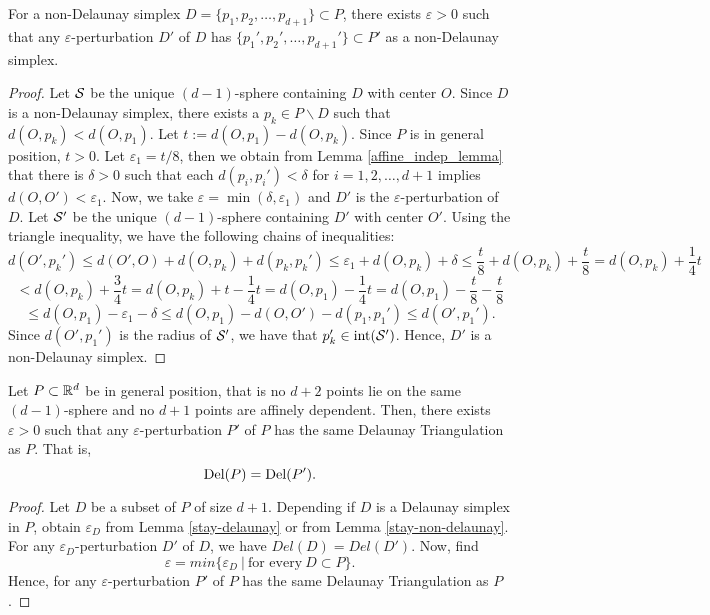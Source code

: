 \documentclass[letterpaper,titlepage]{article}
\begin{document}
    \begin{lem}\label{stay-non-delaunay}
        For a non-Delaunay simplex $D= \{p_1,p_2,\dots,p_{d+1}\} \subset P$, there exists $\varepsilon>0$ such that any $\varepsilon$-perturbation $D'$ of $D$ has $\{p_1',p_2',\dots,p_{d+1}'\} \subset P'$ as a non-Delaunay simplex.
    \end{lem}
    \begin{proof}
        Let $\mathcal{S}$ be the unique $(d-1)$-sphere containing $D$ with center $O$. Since $D$ is a non-Delaunay simplex, there exists a $p_k \in P\backslash D$ such that $d(O,p_k) < d(O,p_1)$. Let $t:=d(O,p_1)-d(O,p_k)$. Since $P$ is in general position, $t>0$. Let $\varepsilon_1 = t/8$, then we obtain from Lemma \ref{affine_indep_lemma} that there is $\delta>0$ such that each $d(p_i,p_i')<\delta$ for $i=1,2,\dots,d+1$ implies $d(O,O')<\varepsilon_1$. Now, we take $\varepsilon = \min(\delta, \varepsilon_1)$ and $D'$ is the $\varepsilon$-perturbation of $D$. Let $\mathcal{S}'$ be the unique $(d-1)$-sphere containing $D'$ with center $O'$. Using the triangle inequality, we have the following chains of inequalities:
        $$d(O',p_k') \leq d(O',O)+d(O,p_k)+d(p_k,p_k') \leq \varepsilon_1 + d(O,p_k)+\delta \leq \frac{t}{8}+d(O,p_k)+\frac{t}{8}=d(O,p_k)+\frac{1}{4}t$$
        $$< d(O,p_k)+\frac{3}{4}t = d(O,p_k)+t-\frac{1}{4}t = d(O,p_1)-\frac{1}{4}t = d(O,p_1)-\frac{t}{8}-\frac{t}{8}$$
        $$\leq d(O,p_1)-\varepsilon_1-\delta \leq d(O,p_1)-d(O,O')-d(p_1,p_1') \leq d(O',p_1').$$
        Since $d(O',p_1')$ is the radius of $\mathcal{S}'$, we have that $p_k' \in \text{int}(\mathcal{S}')$. Hence, $D'$ is a non-Delaunay simplex.
    \end{proof}
    
    
    \begin{thm}
        Let $P \subset \mathbb{R}^d$ be in general position, that is no $d+2$ points lie on the same $(d-1)$-sphere and no $d+1$ points are affinely dependent. Then, there exists $\varepsilon>0$ such that any $\varepsilon$-perturbation $P'$ of $P$ has the same Delaunay Triangulation as $P$. That is,
        $$\text{Del}(P) = \text{Del}(P').$$
    \end{thm}
    \begin{proof}
        Let $D$ be a subset of $P$ of size $d+1$. Depending if $D$ is a Delaunay simplex in $P$, obtain $\varepsilon_D$ from Lemma \ref{stay-delaunay} or from Lemma \ref{stay-non-delaunay}. For any $\varepsilon_D$-perturbation $D'$ of $D$, we have $Del(D)=Del(D')$. Now, find
        $$\varepsilon = min \{\varepsilon_D\ |\ \text{for every}\ D \subset P\}.$$
        Hence, for any $\varepsilon$-perturbation $P'$ of $P$ has the same Delaunay Triangulation as $P$.
    \end{proof}
    
\end{document}
